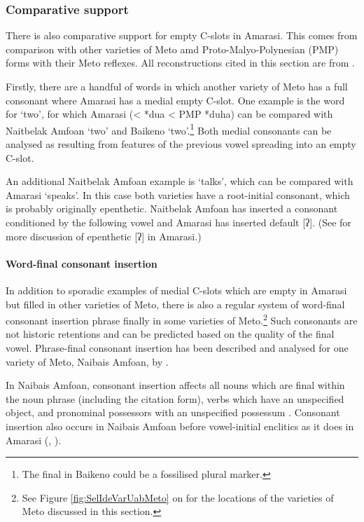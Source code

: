 \subsubsection{Comparative support}\label{sec:ComSup}
There is also comparative support for empty C-slots in Amarasi.
This comes from comparison with other varieties of Meto amd
Proto-Malyo-Polynesian (PMP) forms with their Meto reflexes.
All reconstructions cited in this section are from \citep{bltr}.

Firstly, there are a handful of words in which another variety of Meto
has a full consonant where Amarasi has a medial empty C-slot.
One example is the word for `two',
for which Amarasi  (< *dua < PMP *duha) can
be compared with Naitbelak Amfo{\Q}an  `two' 
and Baikeno  `two'.\footnote{
		The final  in Baikeno  could be a fossilised plural marker.}
Both medial consonants can be analysed as resulting from features of the
previous vowel spreading into an empty C-slot.

An additional Naitbelak Amfo{\Q}an example is  `talks',
which can be compared with Amarasi  `speaks'.
In this case both varieties have a root-initial consonant,
which is probably originally epenthetic.
Naitbelak Amfo{\Q}an has inserted a consonant conditioned
by the following vowel and Amarasi has inserted default [ʔ].
(See  for more discussion of epenthetic [ʔ] in Amarasi.)

\paragraph{Word-final consonant insertion}\label{sec:WorFinConIns}
In addition to sporadic examples of medial C-slots which are empty in Amarasi
but filled in other varieties of Meto,
there is also a regular system of word-final consonant insertion
phrase finally in some varieties of Meto.\footnote{
		See Figure \ref{fig:SelIdeVarUabMeto} on 
		for the locations of the varieties of Meto discussed in this section.}
Such consonants are not historic retentions
and can be predicted based on the quality of the final vowel.
Phrase-final consonant insertion has been described
and analysed for one variety of Meto, Nai{\Q}bais Amfo{\Q}an, by \citet{cu18}.

In Nai{\Q}bais Amfo{\Q}an, consonant insertion affects
all nouns which are final within the noun phrase (including the citation form),
verbs which have an unspecified object, and pronominal possessors
with an unspecified possessum \citep[31ff]{cu18}.
Consonant insertion also occurs in Nai{\Q}bais Amfo{\Q}an
before vowel-initial enclitics as it does in Amarasi
(, ).

